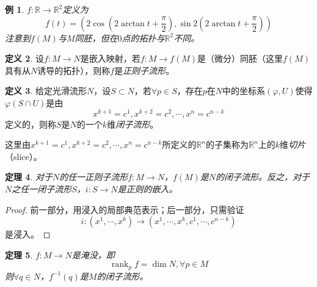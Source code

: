 \documentclass[winfonts,UTF8,c5size,a4paper,fancyhdr,hyperref,titlepage,nocap]{ctexart}
\newtheorem{thm}{定理}
\newtheorem{exa}[thm]{例}
\theoremstyle{definition}
\newtheorem{defn}[thm]{定义}
\theoremstyle{remark}
\numberwithin{equation}{subsection}
\newcommand{\Real}{\mathbb{R}}
\newcommand{\red}{\color{red}}
\newcommand{\rank}{\operatorname{rank}}
\begin{document}
\begin{exa}
$f\colon\Real\to\Real^2$定义为
\begin{equation*}
f(t)=(2\cos(2\arctan t+\frac{\pi}{2}),\sin2(2\arctan t+\frac{\pi}{2}))
\end{equation*}
注意到$f(M)$与$M$同胚，但在$0$点的拓扑与$\Real^2$不同。
\end{exa}
\begin{defn}
  设$f\colon M\to N$是嵌入映射，若$f\colon M\to f(M)$是（微分）同胚（这里$f(M)$具有从$N$诱导的拓扑），则称$f$是\emph{\red 正则子流形}。
\end{defn}
\begin{defn}
给定光滑流形$N$，设$S\subset N$，若$\forall p\in S$，存在$p$在$N$中的坐标系$(\varphi,U)$使得$\varphi(S\cap U)$是由
\begin{equation*}
x^{k+1}=c^1,x^{k+2}=c^2,\cdots,x^n=c^{n-k}
\end{equation*}
定义的，则称$S$是$N$的一个$k$维\emph{\red 闭子流形}。

这里由$x^{k+1}=c^1,x^{k+2}=c^2,\cdots,x^n=c^{n-k}$所定义的$\Real^n$的子集称为$\Real^n$上的$k$维\emph{\red 切片}（slice）。
\end{defn}
\begin{thm}
  对于$N$的任一正则子流形$f\colon M\to N$，$f(M)$是$N$的闭子流形。反之，对于$N$之任一闭子流形$S$，$i\colon S\to N$是正则的嵌入。
\end{thm}
\begin{proof}
前一部分，用浸入的局部典范表示；后一部分，只需验证
\begin{equation*}
i\colon(x^1,\cdots,x^k)\to(x^1,\cdots,x^k,c^1,\cdots,c^{n-k})
\end{equation*}
是浸入。
\end{proof}
\begin{thm}\label{淹没原像}
  $f\colon M\to N$是淹没，即
\begin{equation*}
\rank_pf=\dim N, \forall p\in M
\end{equation*}
则$\forall q\in N$，$f^{-1}(q)$是$M$的闭子流形。
\end{thm}
\end{document}
